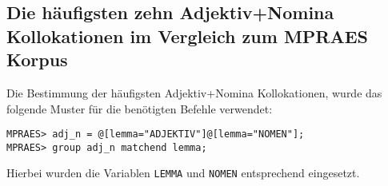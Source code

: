 \documentclass[%
	type=document,%
  	style=article,%
  	media=print,
  	pages=oneside,%
  	prefixLecturer=Dozenten:,
  	author=multiple,
]{unihildesheim} %
\begin{document}
\subsection{Die häufigsten zehn Adjektiv+Nomina Kollokationen im Vergleich zum
MPRAES Korpus}
Die Bestimmung der häufigsten Adjektiv+Nomina Kollokationen, wurde das folgende
Muster für die benötigten Befehle verwendet:
\begin{Verbatim}[frame=single,label=CQP,commandchars=\\\{\}]
MPRAES> adj_n = @[lemma="ADJEKTIV"]@[lemma="NOMEN"];
MPRAES> group adj_n matchend lemma;
\end{Verbatim}
Hierbei wurden die Variablen \texttt{LEMMA} und \texttt{NOMEN} entsprechend
 eingesetzt.
\begin{table}[!hpb]\label{t}
	\center
	\begin{tabularx}{\textwidth}{llrrrr}


\end{tabularx}
\end{table}
\end{document}
